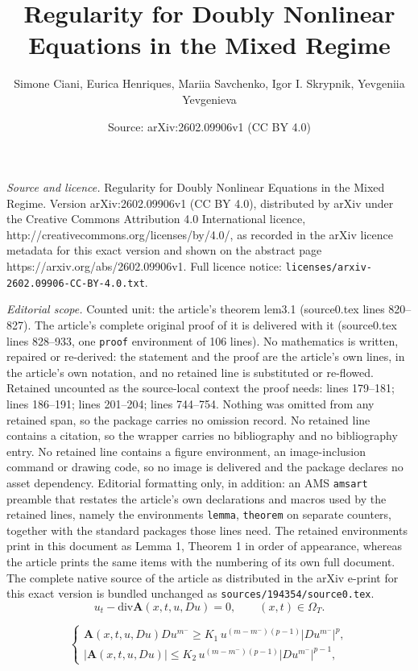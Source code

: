 \documentclass[10pt,a4paper]{amsart}
\title{Regularity for Doubly Nonlinear Equations in the Mixed Regime}
\author{Simone Ciani, Eurica Henriques, Mariia Savchenko, Igor I. Skrypnik, Yevgeniia Yevgenieva}
\date{Source: arXiv:2602.09906v1 (CC BY 4.0)}
\begin{document}
\maketitle

\noindent\emph{Source and licence.} Regularity for Doubly Nonlinear Equations in the Mixed Regime. Version arXiv:2602.09906v1 (CC BY 4.0), distributed by arXiv under the Creative Commons Attribution 4.0 International licence, http://creativecommons.org/licenses/by/4.0/, as recorded in the arXiv licence metadata for this exact version and shown on the abstract page https://arxiv.org/abs/2602.09906v1. Full licence notice: \texttt{licenses/arxiv-2602.09906-CC-BY-4.0.txt}.\par\smallskip

\noindent\textit{Editorial scope.} Counted unit: the article's theorem lem3.1 (source0.tex lines 820--827). The article's complete original proof of it is delivered with it (source0.tex lines 828--933, one \texttt{proof} environment of 106 lines). No mathematics is written, repaired or re-derived: the statement and the proof are the article's own lines, in the article's own notation, and no retained line is substituted or re-flowed.  Retained uncounted as the source-local context the proof needs: lines 179--181; lines 186--191; lines 201--204; lines 744--754.  Nothing was omitted from any retained span, so the package carries no omission record.  No retained line contains a citation, so the wrapper carries no bibliography and no bibliography entry.  No retained line contains a figure environment, an image-inclusion command or drawing code, so no image is delivered and the package declares no asset dependency.  Editorial formatting only, in addition: an AMS \texttt{amsart} preamble that restates the article's own declarations and macros used by the retained lines, namely the environments \texttt{lemma}, \texttt{theorem} on separate counters, together with the standard packages those lines need.  The retained environments print in this document as Lemma 1, Theorem 1 in order of appearance, whereas the article prints the same items with the numbering of its own full document.  The complete native source of the article as distributed in the arXiv e-print for this exact version is bundled unchanged as \texttt{sources/194354/source0.tex}.
\begin{equation}\label{eq1.1}
u_{t}-\textrm{div}\mathbf{A}(x, t, u, D u)=0, \quad \quad  (x, t)\in \Omega_{T}.
\end{equation}

\begin{equation}\label{eq1.2}
\begin{cases}
\mathbf{A}(x, t, u, D u) D u^{m^-} \geqslant  K_{1}\,u^{(m-m^-)(p-1)}|D u^{m^-}|^{p},\\
|\mathbf{A}(x, t, u,  D u)| \leqslant  K_{2}\,u^{(m-m^-)(p-1)}|D u^{m^-}|^{p-1},
\end{cases}
\end{equation}
\end{document}
